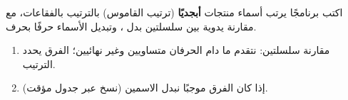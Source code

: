 \begin{statement}
اكتب برنامجًا يرتب أسماء  منتجات \textbf{أبجديًا} (ترتيب القاموس) بالترتيب بالفقاعات، مع مقارنة يدوية بين سلسلتين بدل ، وتبديل الأسماء حرفًا بحرف.
\end{statement}
\begin{stepsbox}\begin{enumerate}
\item مقارنة سلسلتين: نتقدم ما دام الحرفان متساويين وغير نهائيين؛ الفرق  يحدد الترتيب.
\item إذا كان الفرق موجبًا نبدل الاسمين (نسخ عبر جدول مؤقت).
\end{enumerate}\end{stepsbox}

